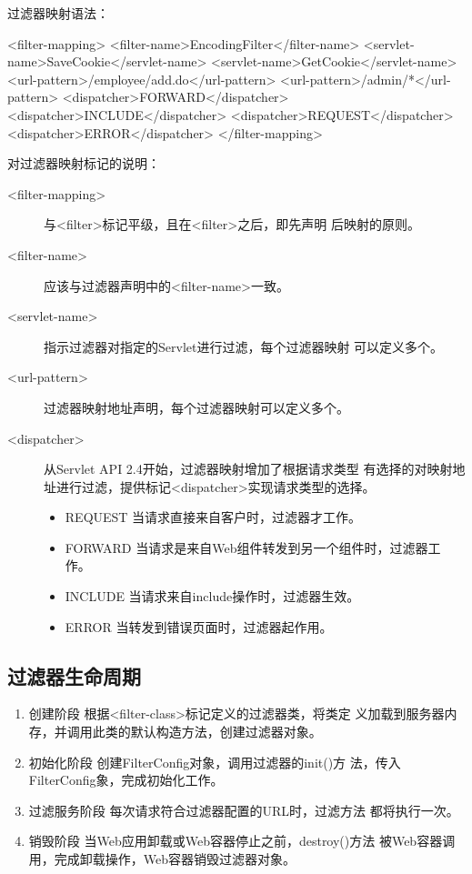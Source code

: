 过滤器映射语法：

\begin{xmlCode}
  <filter-mapping>
    <filter-name>EncodingFilter</filter-name>
    <servlet-name>SaveCookie</servlet-name>
    <servlet-name>GetCookie</servlet-name>
    <url-pattern>/employee/add.do</url-pattern>
    <url-pattern>/admin/*</url-pattern>
    <dispatcher>FORWARD</dispatcher>
    <dispatcher>INCLUDE</dispatcher>
    <dispatcher>REQUEST</dispatcher>
    <dispatcher>ERROR</dispatcher>
  </filter-mapping>
\end{xmlCode}


对过滤器映射标记的说明：

\begin{description}
\item[<filter-mapping>] 与<filter>标记平级，且在<filter>之后，即先声明
  后映射的原则。
\item[<filter-name>] 应该与过滤器声明中的<filter-name>一致。
\item[<servlet-name>] 指示过滤器对指定的Servlet进行过滤，每个过滤器映射
  可以定义多个。
\item[<url-pattern>] 过滤器映射地址声明，每个过滤器映射可以定义多个。
\item[<dispatcher>] 从Servlet API 2.4开始，过滤器映射增加了根据请求类型
  有选择的对映射地址进行过滤，提供标记<dispatcher>实现请求类型的选择。
  \begin{itemize}\kai
  \item REQUEST 当请求直接来自客户时，过滤器才工作。
  \item FORWARD 当请求是来自Web组件转发到另一个组件时，过滤器工作。
  \item INCLUDE 当请求来自include操作时，过滤器生效。
  \item ERROR 当转发到错误页面时，过滤器起作用。
  \end{itemize}
\end{description}

\subsection{过滤器生命周期} 

\begin{enumerate}
\item {\hei\Blue 创建阶段} 根据<filter-class>标记定义的过滤器类，将类定
  义加载到服务器内存，并调用此类的默认构造方法，创建过滤器对象。
\item {\hei\Blue 初始化阶段} 创建FilterConfig对象，调用过滤器的init()方
  法，传入FilterConfig象，完成初始化工作。
\item {\hei\Blue 过滤服务阶段} 每次请求符合过滤器配置的URL时，过滤方法
  都将执行一次。
\item {\hei\Blue 销毁阶段} 当Web应用卸载或Web容器停止之前，destroy()方法
  被Web容器调用，完成卸载操作，Web容器销毁过滤器对象。
\end{enumerate}

